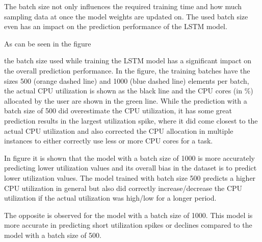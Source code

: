 


  The batch size not only influences the required training time and how much sampling data at once the model weights are updated on. The used batch size even has an impact on the prediction performance of the LSTM model.
    
  As can be seen in the figure 
  
  the batch size used while training the LSTM model has a significant impact on the overall prediction performance.
  In the figure, the training batches have the sizes 500 (orange dashed line) and 1000 (blue dashed line) elements per batch, the actual CPU utilization is shown as the black line and the CPU cores (in \%) allocated by the user are shown in the green line. While the prediction with a batch size of 500 did overestimate the CPU utilization, it has some great prediction results in the largest utilization spike, where it did come closest to the actual CPU utilization and also corrected the CPU allocation in multiple instances to either correctly use less or more CPU cores for a task.
  
  
  


  In figure 
   it is shown that the model with a batch size of 1000 is more accurately predicting lower utilization values and its overall bias in the dataset is to predict lower utilization values.
  The model trained with batch size 500 predicts a higher CPU utilization in general but also did correctly increase/decrease the CPU utilization if the actual utilization was high/low for a longer period.

  The opposite is observed for the model with a batch size of 1000. 
  This model is more accurate in predicting short utilization spikes or declines compared to the model with a batch size of 500.
  


